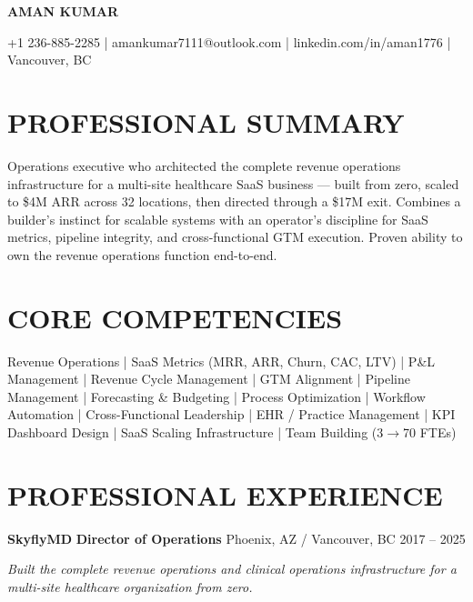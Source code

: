 \documentclass[10pt]{article}
\begin{document}
\centerline{\textbf{\large AMAN KUMAR}}
\centerline{+1 236-885-2285  |  amankumar7111@outlook.com  |  linkedin.com/in/aman1776  |  Vancouver, BC}

\section*{PROFESSIONAL SUMMARY}
Operations executive who architected the complete revenue operations infrastructure for a multi-site healthcare
SaaS business --- built from zero, scaled to \$4M ARR across 32 locations, then directed through a \$17M exit.
Combines a builder's instinct for scalable systems with an operator's discipline for SaaS metrics, pipeline
integrity, and cross-functional GTM execution. Proven ability to own the revenue operations function end-to-end.

\section*{CORE COMPETENCIES}
Revenue Operations  |  SaaS Metrics (MRR, ARR, Churn, CAC, LTV)  |  P\&L Management  |  Revenue Cycle Management  |
GTM Alignment  |  Pipeline Management  |  Forecasting \& Budgeting  |  Process Optimization  |
Workflow Automation  |  Cross-Functional Leadership  |  EHR / Practice Management  |
KPI Dashboard Design  |  SaaS Scaling Infrastructure  |  Team Building (3$\rightarrow$70 FTEs)

\section*{PROFESSIONAL EXPERIENCE}

\textbf{SkyflyMD}  \hfill  \textbf{Director of Operations}  \hfill  Phoenix, AZ / Vancouver, BC  \hfill  2017 -- 2025

\textit{Built the complete revenue operations and clinical operations infrastructure for a multi-site healthcare organization from zero.}
\end{document}
